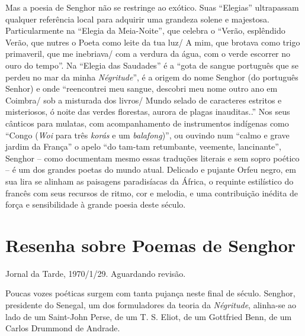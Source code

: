\documentclass[
  letterpaper,
  DIV=11,
  numbers=noendperiod]{scrreprt}
\begin{document}
Mas a poesia de Senghor não se restringe ao exótico. Suas ``Elegias''
ultrapassam qualquer referência local para adquirir uma grandeza solene
e majestosa. Particularmente na ``Elegia da Meia-Noite'', que celebra o
``Verão, esplêndido Verão, que nutres o Poeta como leite da tua luz/ A
mim, que brotava como trigo primaveril, que me inebriava/ com a verdura
da água, com o verde escorrer no ouro do tempo''. Na ``Elegia das
Saudades'' é a ``gota de sangue português que se perdeu no mar da minha
\emph{Négritude}'', é a origem do nome Senghor (do português Senhor) e
onde ``reencontrei meu sangue, descobri meu nome outro ano em Coimbra/
sob a misturada dos livros/ Mundo selado de caracteres estritos e
misteriosos, ó noite das verdes florestas, aurora de plagas
inauditas..'' Nos seus cânticos para mulatas, com acompanhamento de
instrumentos indígenas como ``Congo (\emph{Woi} para três \emph{korás} e
um \emph{balafong})'', ou ouvindo num ``calmo e grave jardim da França''
o apelo ``do tam-tam retumbante, veemente, lancinante'', Senghor -- como
documentam mesmo essas traduções literais e sem sopro poético -- é um
dos grandes poetas do mundo atual. Delicado e pujante Orfeu negro, em
sua lira se alinham as paisagens paradisíacas da África, o requinte
estilístico do francês com seus recursos de ritmo, cor e melodia, e uma
contribuição inédita de força e sensibilidade à grande poesia deste
século.

\chapter{Resenha sobre Poemas de
Senghor}\label{resenha-sobre-poemas-de-senghor}

Jornal da Tarde, 1970/1/29. Aguardando revisão.

\hfill\break

Poucas vozes poéticas surgem com tanta pujança neste final de século.
Senghor, presidente do Senegal, um dos formuladores da teoria da
\emph{Négritude}, alinha-se ao lado de um Saint-John Perse, de um T. S.
Eliot, de um Gottfried Benn, de um Carlos Drummond de Andrade.
\end{document}
